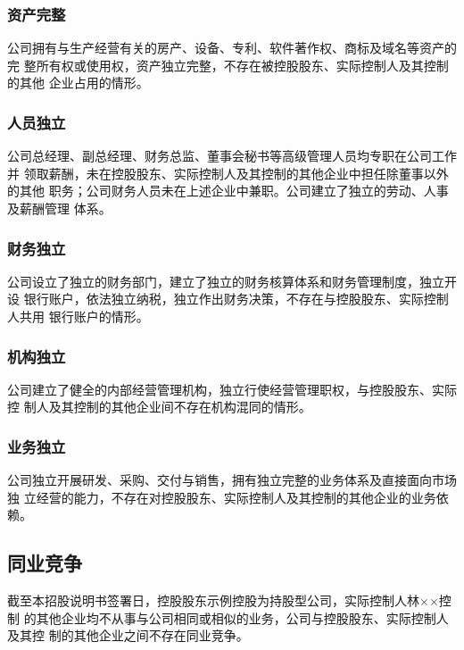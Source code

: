 \subsubsection{资产完整}

公司拥有与生产经营有关的房产、设备、专利、软件著作权、商标及域名等资产的完
整所有权或使用权，资产独立完整，不存在被控股股东、实际控制人及其控制的其他
企业占用的情形。

\subsubsection{人员独立}

公司总经理、副总经理、财务总监、董事会秘书等高级管理人员均专职在公司工作并
领取薪酬，未在控股股东、实际控制人及其控制的其他企业中担任除董事以外的其他
职务；公司财务人员未在上述企业中兼职。公司建立了独立的劳动、人事及薪酬管理
体系。

\subsubsection{财务独立}

公司设立了独立的财务部门，建立了独立的财务核算体系和财务管理制度，独立开设
银行账户，依法独立纳税，独立作出财务决策，不存在与控股股东、实际控制人共用
银行账户的情形。

\subsubsection{机构独立}

公司建立了健全的内部经营管理机构，独立行使经营管理职权，与控股股东、实际控
制人及其控制的其他企业间不存在机构混同的情形。

\subsubsection{业务独立}

公司独立开展研发、采购、交付与销售，拥有独立完整的业务体系及直接面向市场独
立经营的能力，不存在对控股股东、实际控制人及其控制的其他企业的业务依赖。

\subsection{同业竞争}

截至本招股说明书签署日，控股股东示例控股为持股型公司，实际控制人林××控制
的其他企业均不从事与公司相同或相似的业务，公司与控股股东、实际控制人及其控
制的其他企业之间不存在同业竞争。

